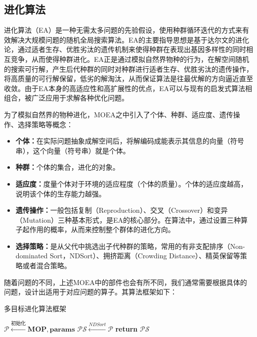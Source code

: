 \subsection{进化算法}
\label{subsec:背景介绍:多目标组合优化算法:进化算法}
进化算法（EA）是一种无需太多问题的先验假设，使用种群循环迭代的方式来有效解决大规模问题的随机全局搜索算法。EA的主要指导思想是基于达尔文的进化论，通过适者生存、优胜劣汰的遗传机制来使得种群在表现出基因多样性的同时相互竞争，从而使得种群进化。EA正是通过模拟自然界物种的行为，在解空间随机的搜索可行解，产生后代种群的同时对种群进行适者生存、优胜劣汰的遗传操作，将高质量的可行解保留，低劣的解淘汰，从而保证算法是往最优解的方向逼近直至收敛。由于EA本身的高适应性和高扩展性的优点，EA可以与现有的启发式算法相组合，被广泛应用于求解各种优化问题。
\par
为了模拟自然界的物种进化，MOEA之中引入了个体、种群、适应度、遗传操作、选择策略等概念：
\begin{itemize}
    \item \textbf{个体：}在实际问题抽象成解空间后，将解编码成能表示其信息的向量（符号串），这个向量（符号串）就是个体。
    \item \textbf{种群：}个体的集合，进化的对象。
    \item \textbf{适应度：}度量个体对于环境的适应程度（个体的质量）。个体的适应度越高，说明该个体的生存能力越强。
    \item \textbf{遗传操作：}一般包括复制（Reproduction）、交叉（Crossover）和变异（Mutation）三种基本形式，是EA的核心部分。在算法中，通过设置三种算子起作用的概率，从而来控制整个群体的进化方向。
    \item \textbf{选择策略：}是从父代中挑选出子代种群的策略，常用的有非支配排序（Non-dominated Sort，NDSort）\cite{srinivas1994muiltiobjective,jensen2003reducing,tang2008fast,mcclymont2012deductive,zhang2014efficient}、拥挤距离（Crowding Distance）\cite{kundu2011multi}、精英保留等策略\cite{deb2002fast}或者混合策略。
\end{itemize}
\par
随着问题的不同，上述MOEA中的部件也会有所不同，我们通常需要根据具体的问题，设计出适用于对应问题的算子。其算法框架如下：
\begin{algorithm}
    \caption{多目标进化算法框架}
    \label{alg:多目标进化算法框架}
    \BlankLine
    $\mathcal{P} \xleftarrow[]{\text{初始化}} \mathbf{MOP},\mathbf{params}$ \;
    $\mathcal{PS} \xleftarrow[]{NDSort} \mathcal{P} $ \;
    \textbf{return } $\mathcal{PS}$ \;
\end{algorithm}
